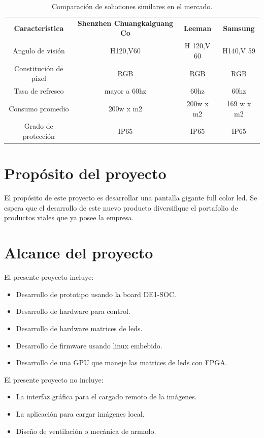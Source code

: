 \begin{table}[]
\caption[Pantallas comerciales]{Comparación de soluciones similares en el mercado.}
\begin{tabular}{|c|c|c|c|}
\textbf{Característica} & \textbf{Shenzhen Chuangkaiguang Co \citep{TABLAREF1}} & \textbf{Leeman \citep{TABLAREF2}} & \textbf{Samsung \citep{TABLAREF3}} \\
Angulo de visión        & H120,V60                             & H 120,V 60      & H140,V 59        \\
Constitución de pixel   & RGB                                  & RGB             & RGB              \\
Tasa de refresco        & mayor a 60hz                         & 60hz            & 60hz             \\
Consumo promedio        & 200w x m2                            & 200w x m2       & 169 w x m2       \\
Grado de protección     & IP65                                 & IP65            & IP65            
\end{tabular}
\label{tab:comercial}
\end{table}





\section{Propósito del proyecto}
El propósito de este proyecto es desarrollar una pantalla gigante full color led. Se espera que el desarrollo de este nuevo producto diversifique el portafolio de productos viales que ya posee la empresa.
\section{Alcance del proyecto}
El presente proyecto incluye:

\begin{itemize}
\item Desarrollo de prototipo usando la board DE1-SOC.
\item Desarrollo de hardware para control.
\item Desarrollo de hardware matrices de leds.
\item Desarrollo de firmware usando linux embebido.
\item Desarrollo de una GPU que maneje las matrices de leds con FPGA.


\end{itemize}

El presente proyecto no incluye:

 \begin{itemize}
\item La interfaz gráfica para el cargado remoto de la imágenes.
\item La aplicación para cargar imágenes local.
\item Diseño de ventilación o mecánica de armado.

\end{itemize}




